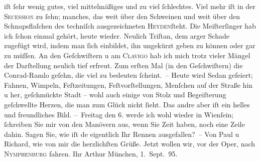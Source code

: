 \begin{ledgroupsized}[t]{13cm}
               iſt ſehr wenig gutes, viel mittelmäßiges und zu viel ſchlechtes. Viel mehr iſt in der
                  \textsc{Secession} zu ſehn; manches, das weit über den Schweinen und weit über den Schnapsflaſchen
               des techniſch ausgezeichneten \textsc{Heyden}ſteht. Die Meiſterſinger hab ich ſchon einmal gehört, heute wieder. Neulich Triſtan, dem arger Schade zugefügt wird, indem
               man ſich einbildet, ihn ungekürzt geben zu können oder gar zu müſſen. An den Geſchwiſtern u am \textsc{Clavigo} hab ich mich trotz vieler Mängel der Darſtellung {\pb}neulich tief erfreut. Zum erſten Mal (in den Geſchwiſtern) die Conrad-Ramlo geſehn,
               die viel zu bedeuten ſcheint. – Heute wird Sedan gefeiert; Fahnen, Wimpeln, Feſtzeitungen, Feſtvorſtellungen, Menſchen
               auf der Straße hin u her, geſchmückte Stadt – wohl auch einige von Stolz und
               Begeiſterung geſchwellte Herzen, die man zum Glück nicht ſieht. Das andre aber iſt
               ein helles und freundliches Bild.\pend
           \pstart
           – Freitag den 6. werde ich wohl wieder in Wienſein; ſchreiben Sie mir von den Manövern aus, wenn
               Sie Zeit haben, noch eine Zeile dahin. Sagen Sie, wie iſt de{\geminationn} eigentlich {\pb}Ihr Rennen
               ausgefallen? –\pend
           \pstart
           Von Paul u Richard, wie von mir die herzlichſten Grüße. Jetzt wollen wir, vor der Oper,
               nach \textsc{Nymphenburg} fahren.\pend
           \pstart Ihr \spacefill\mbox{Arthur}\pend{}\pstart
           München,
                  1. Sept. 95.\pend
           

\end{ledgroupsized}
